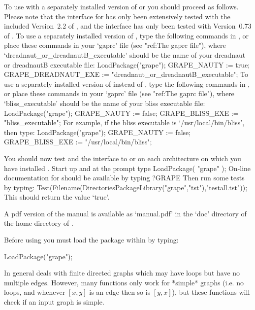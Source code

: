 To use {\GRAPE} with a separately installed version of {\nauty} or
{\bliss} you should proceed as follows. Please note that the {\nauty}
interface for {\GRAPE} has only been extensively tested with the
included Version~2.2 of {\nauty}, and the {\bliss} interface has only
been tested with Version~0.73 of {\bliss}. To use a separately
installed version of {\nauty}, type the following commands in {\GAP}, or 
place these commands in your `gaprc' file (see "ref:The gaprc file"), where
`dreadnaut_or_dreadnautB_executable' should be the name of your
dreadnaut or dreadnautB executable file:
\begintt
LoadPackage("grape"); 
GRAPE_NAUTY := true; 
GRAPE_DREADNAUT_EXE := "dreadnaut_or_dreadnautB_executable"; 
\endtt 
To use a separately installed version of {\bliss} instead of {\nauty},
type the following commands in {\GAP}, or place these commands in your
`gaprc' file (see "ref:The gaprc file"), where `bliss_executable' should be
the name of your bliss executable file:
\begintt
LoadPackage("grape"); 
GRAPE_NAUTY := false; 
GRAPE_BLISS_EXE := "bliss_executable"; 
\endtt 
For example, if the bliss executable is `/usr/local/bin/bliss', then type:
\begintt
LoadPackage("grape"); 
GRAPE_NAUTY := false; 
GRAPE_BLISS_EXE := "/usr/local/bin/bliss"; 
\endtt 

You should now test {\GRAPE} and the interface to {\nauty} or {\bliss}
on each architecture on which you have installed {\GRAPE}. Start up
{\GAP} and at the prompt type 
\begintt 
LoadPackage( "grape" ); 
\endtt
On-line documentation for {\GRAPE} should be available by typing 
\begintt
?GRAPE 
\endtt 
Then run some tests by typing:
\begintt
Test(Filename(DirectoriesPackageLibrary("grape","tst"),"testall.tst"));
\endtt
This should return the value `true'.
	
A pdf version of the {\GRAPE} manual is available as `manual.pdf' in the
`doc' directory of the home directory of {\GRAPE}.


Before using {\GRAPE} you must load the package within {\GAP} by typing:

\begintt
LoadPackage("grape");
\endtt

 
In general {\GRAPE} deals with finite directed graphs which may have
loops but have no multiple edges. However, many {\GRAPE} functions only
work for *simple* graphs (i.e. no loops, and whenever $[x,y]$ is an
edge then so is $[y,x]$), but these functions will check if an input
graph is simple.

